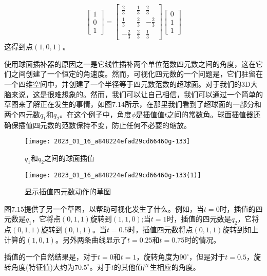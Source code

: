 \begin{align}
    \left[\begin{array}{l}
        1 \\
        0 \\
        1
        \end{array}\right]=\left[\begin{array}{ccc}
        \frac{2}{3} & \frac{1}{3} & \frac{2}{3} \\
        \frac{1}{3} & \frac{2}{3} & -\frac{2}{3} \\
        -\frac{2}{3} & \frac{2}{3} & \frac{1}{3}
        \end{array}\right]\left[\begin{array}{l}
        0 \\
        1 \\
        1
        \end{array}\right]
\end{align}
这得到点$(1,0,1)$。

使用球面插补器的原因之一是它线性插补两个单位范数四元数之间的角度，这在它们之间创建了一个恒定的角速度。然而，可视化四元数的一个问题是，它们驻留在一个四维空间中，并创建了一个半径等于四元数范数的超球面。对于我们的3D大脑来说，这是很难想象的。然而，我们可以让自己相信，我们可以通过一个简单的草图来了解正在发生的事情，如图7.14所示，在那里我们看到了超球面的一部分和两个四元数$q_{1}$和$q_{2}$。在这个例子中，角度$\phi$是插值值$t$之间的常数角。球面插值器还确保插值四元数的范数保持不变，防止任何不必要的缩放。

\begin{figure}[h!]
    \texttt{[image: 2023\_01\_16\_a848224efad29cd66460g-133]}
    \caption[short]{$q_{1}$和$q_{2}$之间的球面插值}
\end{figure}

\begin{figure}[h!]
    \texttt{[image: 2023\_01\_16\_a848224efad29cd66460g-133(1)]}
    \caption[short]{显示插值四元数动作的草图}
\end{figure}

图$7.15$提供了另一个草图，以帮助可视化发生了什么。例如，当$t=0$时，插值的四元数是$q_{1}$，它将点$(0,1,1)$旋转到$(1,1,0)$;当$t=1$时，插值的四元数是$q_{2}$，它将点$(0,1,1)$旋转到$(0,1,1)$。当$t=0.5$时，插值四元数将点$(0,1,1)$旋转到如上计算的$(1,0,1)$。另外两条曲线显示了$t=0.25$和$t=0.75$时的情况。

插值的一个自然结果是，对于$t=0$和$t=1$，旋转角度为$90^{\circ}$，但是对于$t=0.5$，旋转角度(特征值)大约为$70.5^{\circ}$。对于$t$的其他值产生相应的角度。

